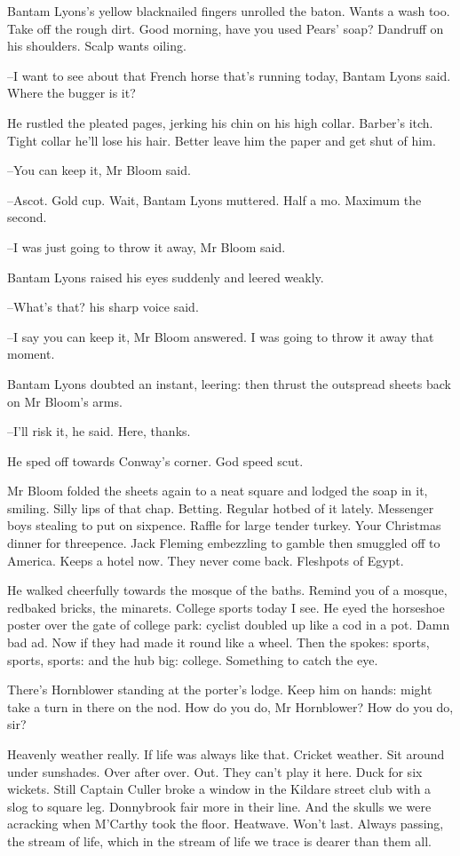Bantam Lyons's yellow blacknailed fingers unrolled the baton.
Wants a wash too.
Take off the rough dirt.
Good morning, have you used Pears' soap?
Dandruff on his shoulders.
Scalp wants oiling.

--I want to see about that French horse that's running today,
Bantam Lyons said.
Where the bugger is it?

He rustled the pleated pages,
jerking his chin on his high collar.
Barber's itch.
Tight collar he'll lose his hair.
Better leave him the paper and get shut of him.

--You can keep it,
Mr Bloom said.

--Ascot.
Gold cup.
Wait,
Bantam Lyons muttered.
Half a mo.
Maximum the second.

--I was just going to throw it away,
Mr Bloom said.

Bantam Lyons raised his eyes suddenly and leered weakly.

--What's that?
his sharp voice said.

--I say you can keep it,
Mr Bloom answered.
I was going to throw it away that moment.

Bantam Lyons doubted an instant, leering:
then thrust the outspread sheets back on Mr Bloom's arms.

--I'll risk it,
he said.
Here, thanks.

He sped off towards Conway's corner.
God speed scut.

Mr Bloom folded the sheets again to a neat square
and lodged the soap in it,
smiling.
Silly lips of that chap.
Betting.
Regular hotbed of it lately.
Messenger boys stealing to put on sixpence.
Raffle for large tender turkey.
Your Christmas dinner for threepence.
Jack Fleming embezzling to gamble
then smuggled off to America.
Keeps a hotel now.
They never come back.
Fleshpots of Egypt.

He walked cheerfully towards the mosque of the baths.
Remind you of a mosque,
redbaked bricks, the minarets.
College sports today I see.
He eyed the horseshoe poster over the gate of college park:
cyclist doubled up like a cod in a pot.
Damn bad ad.
Now if they had made it round like a wheel.
Then the spokes:
sports, sports, sports: and the hub big:
college.
Something to catch the eye.

There's Hornblower standing at the porter's lodge.
Keep him on hands:
might take a turn in there on the nod.
How do you do, Mr Hornblower?
How do you do, sir?

Heavenly weather really.
If life was always like that.
Cricket weather.
Sit around under sunshades.
Over after over.
Out.
They can't play it here.
Duck for six wickets.
Still Captain Culler broke a window in the Kildare street club
with a slog to square leg.
Donnybrook fair more in their line.
And the skulls we were acracking when M'Carthy took the floor.
Heatwave.
Won't last.
Always passing,
the stream of life,
which in the stream of life we trace
is dearer than them all.

